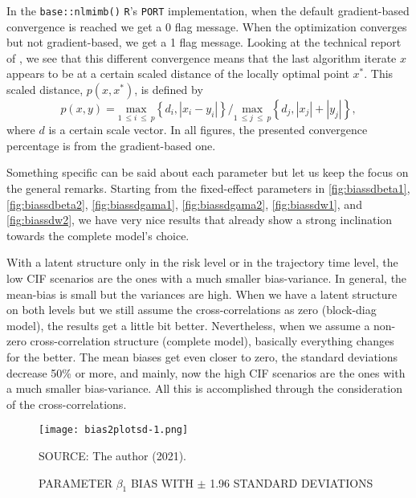 In the \texttt{base::nlmimb()} \texttt{R}'s \texttt{PORT}
implementation, when the default gradient-based convergence is reached
we get a 0 flag message. When the optimization converges but not
gradient-based, we get a 1 flag message. Looking at the technical report
of , we see that this different convergence means
that the last algorithm iterate \(x\) appears to be at a certain scaled
distance of the locally optimal point \(x^{\ast}\). This scaled
distance, \(p(x, x^{\ast})\), is defined by
\[
 p(x, y) =
 \underset{1~\leq i~\leq~p}{\text{max}}
 \left\{d_{i}, |x_{i} - y_{i}|\right\}
 \Big/
 \underset{1~\leq j~\leq~p}{\text{max}}
 \left\{d_{j}, |x_{j}| + |y_{j}|\right\},
\]
where \(d\) is a certain scale vector. In all figures, the presented
convergence percentage is from the gradient-based one.

Something specific can be said about each parameter but let us keep the
focus on the general remarks. Starting from the fixed-effect parameters
in \autoref{fig:biassdbeta1}, \autoref{fig:biassdbeta2},
\autoref{fig:biassdgama1}, \autoref{fig:biassdgama2},
\autoref{fig:biassdw1}, and \autoref{fig:biassdw2}, we have very nice
results that already show a strong inclination towards the complete
model's choice.

With a latent structure only in the risk level or in the trajectory time
level, the low CIF scenarios are the ones with a much smaller
bias-variance. In general, the mean-bias is small but the variances are
high. When we have a latent structure on both levels but we still assume
the cross-correlations as zero (block-diag model), the results get a
little bit better. Nevertheless, when we assume a non-zero
cross-correlation structure (complete model), basically everything
changes for the better. The mean biases get even closer to zero, the
standard deviations decrease 50\% or more, and mainly, now the high CIF
scenarios are the ones with a much smaller bias-variance. All this is
accomplished through the consideration of the cross-correlations.

\begin{figure}[H]
 \setlength{\abovecaptionskip}{.0001pt}
 \caption{PARAMETER \(\beta_{1}\) BIAS WITH \(\pm\) 1.96 STANDARD
          DEVIATIONS}
 \vspace{0.2cm}\centering
 \texttt{[image: bias2plotsd-1.png]}\\
 \begin{footnotesize}
  SOURCE: The author (2021).
 \end{footnotesize}
 \label{fig:biassdbeta1}
\end{figure}

